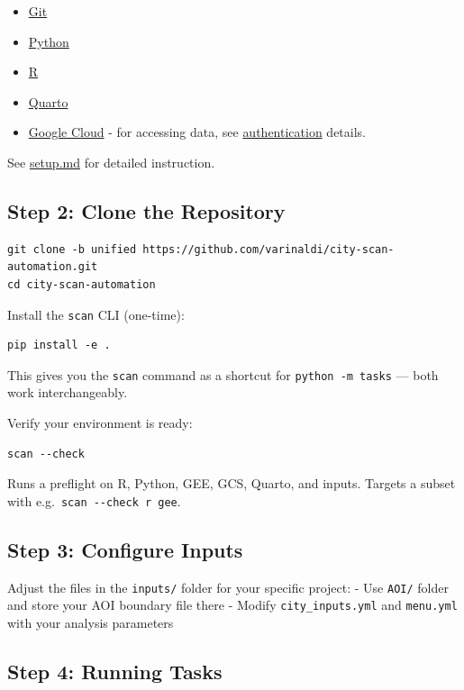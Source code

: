 \documentclass[
  letterpaper,
  DIV=11,
  numbers=noendperiod]{scrreprt}
\providecommand{\tightlist}{%
  \setlength{\itemsep}{0pt}\setlength{\parskip}{0pt}}
\begin{document}
\begin{itemize}
\tightlist
\item
  \hyperref[git]{Git}
\item
  \hyperref[python]{Python}
\item
  \hyperref[r]{R}
\item
  \hyperref[quarto]{Quarto}
\item
  \hyperref[gcloud]{Google Cloud} - for accessing data, see
  \href{../reference/googlecloud.md}{authentication} details.
\end{itemize}

See \url{setup.md} for detailed instruction.

\subsection{Step 2: Clone the
Repository}\label{step-2-clone-the-repository}

\begin{verbatim}
git clone -b unified https://github.com/varinaldi/city-scan-automation.git
cd city-scan-automation
\end{verbatim}

Install the \texttt{scan} CLI (one-time):

\begin{verbatim}
pip install -e .
\end{verbatim}

This gives you the \texttt{scan} command as a shortcut for
\texttt{python\ -m\ tasks} --- both work interchangeably.

Verify your environment is ready:

\begin{verbatim}
scan --check
\end{verbatim}

Runs a preflight on R, Python, GEE, GCS, Quarto, and inputs. Targets a
subset with e.g.~\texttt{scan\ -\/-check\ r\ gee}.

\subsection{Step 3: Configure Inputs}\label{step-3-configure-inputs}

Adjust the files in the \texttt{inputs/} folder for your specific
project: - Use \texttt{AOI/} folder and store your AOI boundary file
there - Modify \texttt{city\_inputs.yml} and \texttt{menu.yml} with your
analysis parameters

\subsection{Step 4: Running Tasks}\label{step-4-running-tasks}
\end{document}
